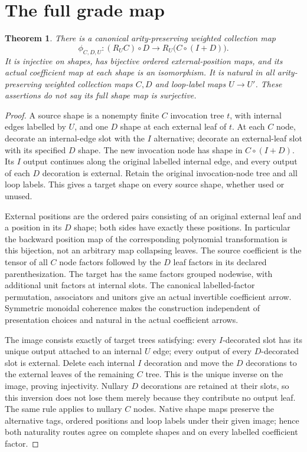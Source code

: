 \documentclass{article}
\newtheorem{theorem}{Theorem}
\begin{document}
\section{The full grade map}
\begin{theorem}
There is a canonical arity-preserving weighted collection map
\[
 \phi_{C,D,U}:(R_UC)\circ D\longrightarrow
 R_U\bigl(C\circ(I+D)\bigr). \tag{1}
\]
It is injective on shapes, has bijective ordered external-position maps,
and its actual coefficient map at each shape is an isomorphism. It is
natural in all arity-preserving weighted collection maps $C,D$ and loop-label
maps $U\to U'$. These assertions do not say its full shape map is surjective.
\end{theorem}
\begin{proof}
A source shape is a nonempty finite $C$ invocation tree $t$, with internal
edges labelled by $U$, and one $D$ shape at each external leaf of $t$.
At each $C$ node, decorate an internal-edge slot with the $I$ alternative;
decorate an external-leaf slot with its specified $D$ shape. The new
invocation node has shape in $C\circ(I+D)$. Its $I$ output continues along
the original labelled internal edge, and every output of each $D$ decoration
is external. Retain the original invocation-node tree and all loop labels.
This gives a target shape on every source shape, whether used or unused.

External positions are the ordered pairs consisting of an original external
leaf and a position in its $D$ shape; both sides have exactly these positions.
In particular the backward position map of the corresponding polynomial
transformation is this bijection, not an arbitrary map collapsing leaves.
The source coefficient is the tensor of all $C$ node factors followed by the
$D$ leaf factors in its declared parenthesization. The target has the same
factors grouped nodewise, with additional unit factors at internal slots.
The canonical labelled-factor permutation, associators and unitors give an
actual invertible coefficient arrow. Symmetric monoidal coherence makes the
construction independent of presentation choices and natural in the actual
coefficient arrows.

The image consists exactly of target trees satisfying: every $I$-decorated
slot has its unique output attached to an internal $U$ edge; every output
of every $D$-decorated slot is external. Delete each internal $I$ decoration
and move the $D$ decorations to the external leaves of the remaining $C$
tree. This is the unique inverse on the image, proving injectivity. Nullary
$D$ decorations are retained at their slots, so this inversion does not lose
them merely because they contribute no output leaf. The same rule applies
to nullary $C$ nodes. Native shape maps preserve the alternative tags, ordered
positions and loop labels under their given image; hence both naturality
routes agree on complete shapes and on every labelled coefficient factor.
\end{proof}
\end{document}
